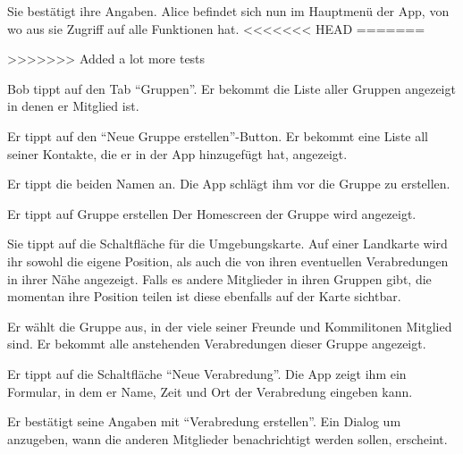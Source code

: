 \documentclass[parskip=full,11pt]{scrartcl}
\begin{document}
{Sie bestätigt ihre Angaben.}
{Alice befindet sich nun im Hauptmenü der App, von wo aus sie Zugriff auf alle Funktionen hat.}
<<<<<<< HEAD
=======

>>>>>>> Added a lot more tests


{Bob tippt auf den Tab  \enquote{Gruppen}.}
{Er bekommt die Liste aller Gruppen angezeigt in denen er Mitglied ist.}

{Er tippt auf den \enquote{Neue Gruppe erstellen}-Button.}
{Er bekommt eine Liste all seiner Kontakte, die er in der App hinzugefügt hat, angezeigt.}

{Er tippt die beiden Namen an.}
{Die App schlägt ihm vor die Gruppe zu erstellen.}

{Er tippt auf Gruppe erstellen}
{Der Homescreen der Gruppe wird angezeigt.} %

{Sie tippt auf die Schaltfläche für die Umgebungskarte.}
{Auf einer Landkarte wird ihr sowohl die eigene Position, als auch die von ihren
eventuellen Verabredungen in ihrer Nähe angezeigt.
Falls es andere Mitglieder in ihren Gruppen gibt, die momentan
ihre Position teilen ist diese ebenfalls auf der Karte sichtbar.}


{Er wählt die Gruppe aus, in der viele seiner Freunde und Kommilitonen Mitglied sind.}
{Er bekommt alle anstehenden Verabredungen dieser Gruppe angezeigt.}

{Er tippt auf die Schaltfläche \enquote{Neue Verabredung}.}
{Die App zeigt ihm ein Formular, in dem er Name, Zeit und Ort der Verabredung eingeben kann.}

{Er bestätigt seine Angaben mit \enquote{Verabredung erstellen}.}
{Ein Dialog um anzugeben, wann die anderen Mitglieder benachrichtigt werden sollen, erscheint.}
\end{document}
